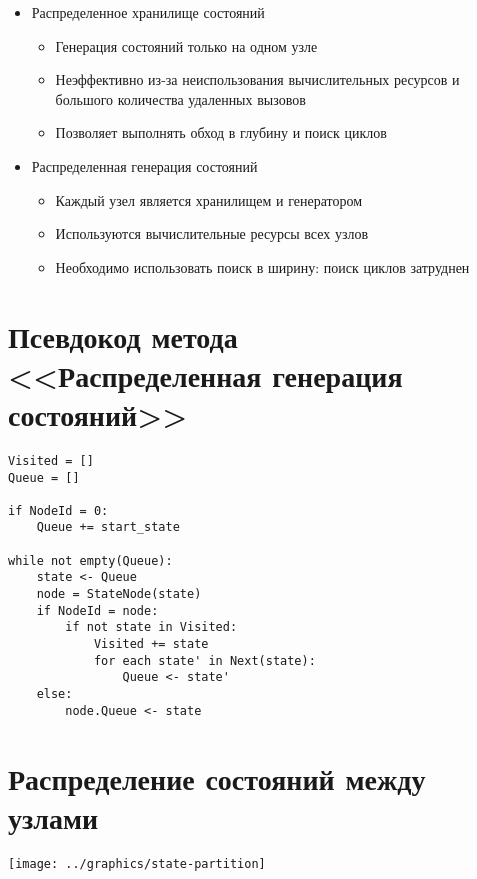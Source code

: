 \documentclass[12pt]{article}
\begin{document}
\begin{itemize}
\item Распределенное хранилище состояний
  \begin{itemize}
  \item Генерация состояний только на одном узле
  \item Неэффективно из-за неиспользования вычислительных ресурсов и большого количества
    удаленных вызовов
  \item Позволяет выполнять обход в глубину и поиск циклов
  \end{itemize}

\item Распределенная генерация состояний
  \begin{itemize}
  \item Каждый узел является хранилищем и генератором
  \item Используются вычислительные ресурсы всех узлов
  \item Необходимо использовать поиск в ширину: поиск циклов затруднен
  \end{itemize}

\end{itemize}

\section{Псевдокод метода \\ <<Распределенная генерация состояний>>}
\label{sec:par-pseudocode}

\scriptsize
\begin{verbatim}
Visited = []
Queue = []

if NodeId = 0:
    Queue += start_state

while not empty(Queue):
    state <- Queue
    node = StateNode(state)
    if NodeId = node:
        if not state in Visited:
            Visited += state
            for each state' in Next(state):
                Queue <- state'
    else:
        node.Queue <- state
\end{verbatim}
\normalsize

\section{Распределение состояний между узлами}
\label{sec:state-partitioning}

\begin{center}
  \texttt{[image: ../graphics/state-partition]}
\end{center}
\end{document}
